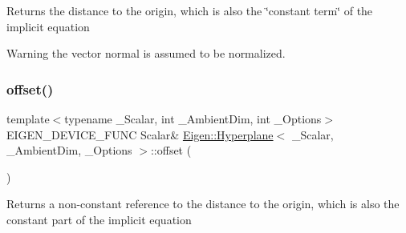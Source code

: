 \begin{DoxyReturn}{Returns}
the distance to the origin, which is also the \char`\"{}constant term\char`\"{} of the implicit equation 
\end{DoxyReturn}
\begin{DoxyWarning}{Warning}
the vector normal is assumed to be normalized. 
\end{DoxyWarning}
\mbox{\label{class_eigen_1_1_hyperplane_afd7e3b9a09ba528523ddc4bac7555dbd}} 
\subsubsection{\texorpdfstring{offset()}{offset()}\hspace{0.1cm}{\footnotesize\ttfamily [2/2]}}
{\footnotesize\ttfamily template$<$typename \+\_\+\+Scalar, int \+\_\+\+Ambient\+Dim, int \+\_\+\+Options$>$ \\
E\+I\+G\+E\+N\+\_\+\+D\+E\+V\+I\+C\+E\+\_\+\+F\+U\+NC Scalar\& \mbox{\hyperlink{class_eigen_1_1_hyperplane}{Eigen\+::\+Hyperplane}}$<$ \+\_\+\+Scalar, \+\_\+\+Ambient\+Dim, \+\_\+\+Options $>$\+::offset (\begin{DoxyParamCaption}{ }\end{DoxyParamCaption})\hspace{0.3cm}{\ttfamily [inline]}}

\begin{DoxyReturn}{Returns}
a non-\/constant reference to the distance to the origin, which is also the constant part of the implicit equation 
\end{DoxyReturn}
\mbox{\label{class_eigen_1_1_hyperplane_af74c608806686a6bd2a96a8d7e5e0247}} 
